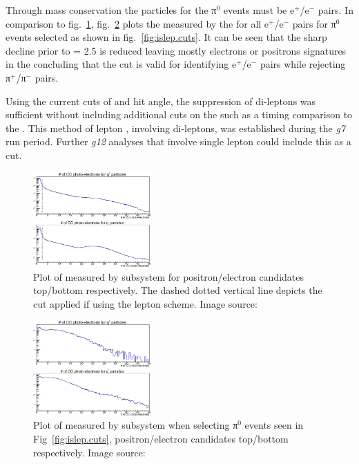 Through mass conservation the particles for the π$^0$ events must be e$^+$/e$^-$ pairs. In comparison to fig.~\ref{fig:islep.CC}, fig.~\ref{fig:islep.CC1} plots the  measured by the  for all e$^+$/e$^-$ pairs for π$^0$ events selected as shown in fig.~\ref{fig:islep.cuts}. It can be seen that the sharp decline prior to  = 2.5 is reduced leaving mostly electrons or positrons signatures in the  concluding that the    cut is valid for identifying e$^+$/e$^-$ pairs while rejecting π$^+$/π$^-$ pairs.

\begin{v2}Using the current cuts of  and hit angle, the suppression of di-leptons was sufficient without including additional cuts on the  such as a timing comparison to the . This method of lepton , involving di-leptons, was established during the \textit{g7} run period. Further \textit{g12} analyses that involve single lepton  could include this as a cut.\end{v2}

%
\begin{figure}\begin{center}
\includegraphics[width=0.4\textwidth]{figures/lepton/CC_nPE.eps}
\caption[Number of Photo-electrons Measured by  for All e$^-$ and e$^+$ Candidates]{\label{fig:islep.CC}Plot of  measured by   subsystem for positron/electron candidates top/bottom respectively. The dashed dotted vertical line depicts the cut applied if using the  lepton  scheme. Image source:~\cite{clas.thesis.kunkel}}
\end{center}\end{figure}

\begin{figure}\begin{center}
\includegraphics[width=0.4\textwidth]{figures/lepton/CC_NPEcut.eps}
\caption[Number of Photo-electrons Measured by  for π$^0$ Events]{\label{fig:islep.CC1}Plot of  measured by   subsystem when selecting π$^0$ events seen in Fig~\ref{fig:islep.cuts}, positron/electron candidates top/bottom respectively. Image source:~\cite{clas.thesis.kunkel}}
\end{center}\end{figure}

